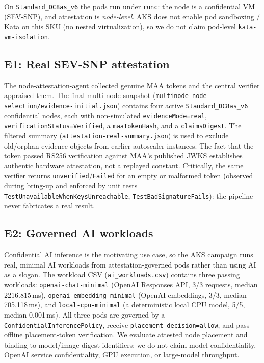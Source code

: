 \noindent On \texttt{Standard\_DC8as\_v6} the pods run under \texttt{runc}: the
node is a confidential VM (SEV-SNP), and attestation is \emph{node-level}. AKS
does not enable pod sandboxing / Kata on this SKU (no nested virtualization), so
we do not claim pod-level \texttt{kata-vm-isolation}.

\subsection{E1: Real SEV-SNP attestation}
The node-attestation-agent collected genuine MAA tokens and the central verifier
appraised them. The final multi-node snapshot
(\texttt{multinode-node-selection/evidence-initial.json}) contains four active
\texttt{Standard\_DC8as\_v6} confidential nodes, each with non-simulated
\texttt{evidenceMode=real}, \texttt{verificationStatus=Verified}, a
\texttt{maaTokenHash}, and a \texttt{claimsDigest}. The filtered summary
(\texttt{attestation-real-summary.json}) is used to exclude old/orphan evidence
objects from earlier autoscaler instances. The fact that the token passed RS256
verification against MAA's published JWKS establishes authentic hardware
attestation, not a replayed constant. Critically, the same verifier returns
\texttt{unverified}/\texttt{Failed} for an empty or malformed token (observed
during bring-up and enforced by unit tests
\texttt{TestUnavailableWhenKeysUnreachable}, \texttt{TestBadSignatureFails}):
the pipeline never fabricates a real result.

\subsection{E2: Governed AI workloads}
\label{sec:e2-ai}
Confidential AI inference is the motivating use case, so the AKS campaign runs
real, minimal AI workloads from attestation-governed pods rather than using AI as
a slogan. The workload CSV (\texttt{ai\_workloads.csv}) contains three passing
workloads: \texttt{openai-chat-minimal} (OpenAI Responses API, 3/3 requests,
median 2216.815\,ms), \texttt{openai-embedding-minimal} (OpenAI embeddings, 3/3,
median 705.118\,ms), and \texttt{local-cpu-minimal} (a deterministic local CPU
model, 5/5, median 0.001\,ms). All three pods are governed by a
\texttt{ConfidentialInferencePolicy}, receive \texttt{placement\_decision=allow},
and pass offline placement-token verification. We evaluate attested node
placement and binding to model/image digest identifiers; we do not claim model
confidentiality, OpenAI service confidentiality, GPU execution, or large-model
throughput.

